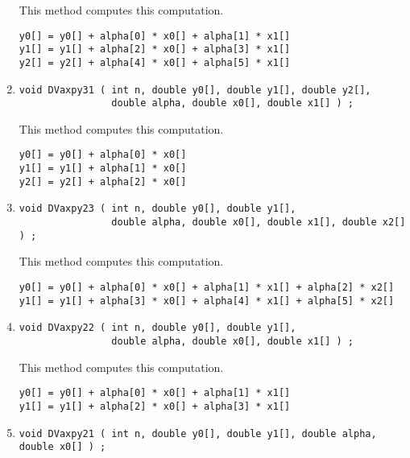 \begin{enumerate}
This method computes this computation.
\begin{verbatim}
y0[] = y0[] + alpha[0] * x0[] + alpha[1] * x1[] 
y1[] = y1[] + alpha[2] * x0[] + alpha[3] * x1[] 
y2[] = y2[] + alpha[4] * x0[] + alpha[5] * x1[] 
\end{verbatim}
\item
\begin{verbatim}
void DVaxpy31 ( int n, double y0[], double y1[], double y2[], 
                double alpha, double x0[], double x1[] ) ;
\end{verbatim}
This method computes this computation.
\begin{verbatim}
y0[] = y0[] + alpha[0] * x0[] 
y1[] = y1[] + alpha[1] * x0[] 
y2[] = y2[] + alpha[2] * x0[] 
\end{verbatim}
\item
\begin{verbatim}
void DVaxpy23 ( int n, double y0[], double y1[], 
                double alpha, double x0[], double x1[], double x2[] ) ;
\end{verbatim}
This method computes this computation.
\begin{verbatim}
y0[] = y0[] + alpha[0] * x0[] + alpha[1] * x1[] + alpha[2] * x2[]
y1[] = y1[] + alpha[3] * x0[] + alpha[4] * x1[] + alpha[5] * x2[]
\end{verbatim}
\item
\begin{verbatim}
void DVaxpy22 ( int n, double y0[], double y1[], 
                double alpha, double x0[], double x1[] ) ;
\end{verbatim}
This method computes this computation.
\begin{verbatim}
y0[] = y0[] + alpha[0] * x0[] + alpha[1] * x1[] 
y1[] = y1[] + alpha[2] * x0[] + alpha[3] * x1[] 
\end{verbatim}
\item
\begin{verbatim}
void DVaxpy21 ( int n, double y0[], double y1[], double alpha, double x0[] ) ;
\end{verbatim}

\end{enumerate}
